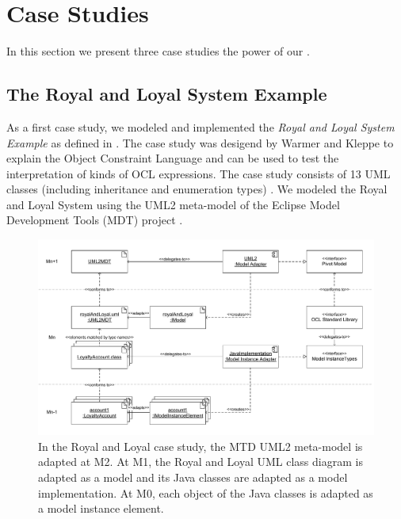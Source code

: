 \section{Case Studies}

In this section we  present three case studies  the power of our . 


\subsection{The Royal and Loyal System Example}

As a first case study, we modeled and implemented the \textit{Royal and Loyal System Example} 
as defined in \cite{warmer:ocl}. The case study was desigend by Warmer and Kleppe to explain 
the Object Constraint Language and can be used to test the interpretation of
 kinds of OCL expressions. The case study
consists of 13 UML classes (including inheritance and enumeration types)
. We modeled the Royal and Loyal System 
using the UML2 meta-model of the Eclipse Model Development Tools (MDT) project
\cite{WWW:MDT}. 

\begin{figure}[tb]
	\centering
		\includegraphics[width=1.00\textwidth]{figures/casestudy01.pdf}
	\caption{In the Royal and Loyal case study, the MTD UML2 meta-model is adapted at M2. At M1, the Royal and Loyal UML class diagram is adapted as a model and its Java classes are adapted as a model implementation. At M0, each object of the Java classes is adapted as a model instance element.}
	\label{fig:casestudy01}
\end{figure}

